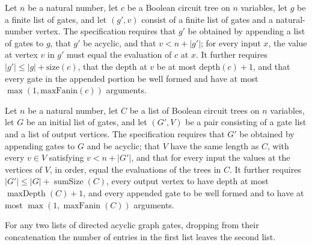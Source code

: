 \begin{definition}
\label{BoolCircuit.CompileSpec}
\leanok
{}
Let $n$ be a natural number, let $c$ be a Boolean circuit tree on $n$ variables, let $g$
be a finite list of gates, and let $(g',v)$ consist of a finite list of gates and a
natural-number vertex. The specification requires that $g'$ be obtained by appending a
list of gates to $g$, that $g'$ be acyclic, and that $v<n+|g'|$; for every input $x$,
the value at vertex $v$ in $g'$ must equal the evaluation of $c$ at $x$. It further
requires $|g'|\le |g|+\mathrm{size}(c)$, that the depth at $v$ be at most
$\mathrm{depth}(c)+1$, and that every gate in the appended portion be well formed and
have at most $\max(1,\mathrm{maxFanin}(c))$ arguments.
\end{definition}

\begin{definition}
\label{BoolCircuit.CompileListSpec}
\leanok
{}
Let $n$ be a natural number, let $C$ be a list of Boolean circuit trees on $n$
variables, let $G$ be an initial list of gates, and let $(G',V)$ be a pair consisting of
a gate list and a list of output vertices. The specification requires that $G'$ be
obtained by appending gates to $G$ and be acyclic; that $V$ have the same length as $C$,
with every $v\in V$ satisfying $v<n+|G'|$, and that for every input the values at the
vertices of $V$, in order, equal the evaluations of the trees in $C$. It further
requires $|G'|\le |G|+\operatorname{sumSize}(C)$, every output vertex to have depth at
most $\operatorname{maxDepth}(C)+1$, and every appended gate to be well formed and to
have at most $\max(1,\operatorname{maxFanin}(C))$ arguments.
\end{definition}

\begin{theorem}
\label{BoolCircuit.drop_append_of_prefix}
\leanok
{}
For any two lists of directed acyclic graph gates, dropping from their concatenation the
number of entries in the first list leaves the second list.
\end{theorem}

